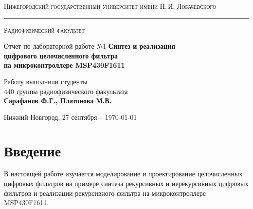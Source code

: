 \documentclass[a4paper,14pt]{extarticle}
\def\labauthors{Сарафанов Ф.Г., Платонова М.В.}
\def\labnumber{1}
\begin{document}
\begin{titlepage}
\begin{center}
{\small\textsc{Нижегородский государственный университет имени Н.\,И. Лобачевского}}
\vskip 2pt \hrule \vskip 3pt
{\small\textsc{Радиофизический факультет}}

\vfill


{{\large Отчет по лабораторной работе №\labnumber}\vskip 12pt {\LARGE \bfseries Синтез и реализация\\[-0.2em] цифрового целочисленного фильтра\\[0.2em]  на  микроконтроллере MSP430F1611}}

	
\vspace{2cm}
{\large Работу выполнили студенты \\[-0.25em] 440 группы радиофизического факультата \\[0.5em] {\Large \bfseries \labauthors}}



\end{center}

\vfill
	
	
	
\begin{center}
	{Нижний Новгород, 27 сентября -- \today}
\end{center}

\end{titlepage}
\tableofcontents
\newpage



\section*{Введение}

В настоящей работе изучается моделирование и проектирование целочисленных цифровых фильтров на примере синтеза рекурсивных и нерекурсивных цифровых фильтров и реализации рекурсивного фильтра на микроконтроллере {MSP430F1611}. 
\end{document}
